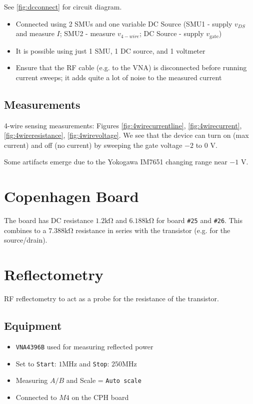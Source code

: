 \documentclass{article}
\begin{document}
\begin{multicols*}{2}
    See \autoref{fig:dcconnect} for circuit diagram.
    \begin{itemize}
        \item Connected using 2 SMUs and one variable DC Source (SMU1 - supply $v_{DS}$ and measure $I$; SMU2 - measure $v_{4-wire}$; DC Source - supply $v_\mathrm{gate}$)
        \item It is possible using just 1 SMU, 1 DC source, and 1 voltmeter
        \item Ensure that the RF cable (e.g. to the VNA) is disconnected before running current sweeps; it adds quite a lot of noise to the measured current
    \end{itemize}

    \subsection{Measurements}

    4-wire sensing measurements: Figures \ref{fig:4wirecurrentline}, \ref{fig:4wirecurrent}, \ref{fig:4wireresistance}, \ref{fig:4wirevoltage}. We see that the device can turn on (max current) and off (no current) by sweeping the gate voltage $-2$ to $0$ V.

    Some artifacts emerge due to the Yokogawa IM7651 changing range near $-1$ V.

    \section{Copenhagen Board}

    The board has DC resistance $1.2\si{\kilo\ohm}$ and $6.188\si{\kilo\ohm}$ for board \verb`#25` and \verb`#26`. This combines to a $7.388\si{\kilo\ohm}$ resistance in series with the transistor (e.g. for the source/drain).

    \section{Reflectometry}

    RF reflectometry to act as a probe for the resistance of the transistor.

    \subsection{Equipment}

    \begin{itemize}
        \item \verb`VNA4396B` used for measuring reflected power
        \item Set to \verb`Start`: $1\si{\mega\hertz}$ and \verb`Stop`: $250\si{\mega\hertz}$
        \item Measuring $A/B$ and Scale = \verb`Auto scale`
        \item Connected to $M4$ on the CPH board
    \end{itemize}


\end{multicols*}
\end{document}
